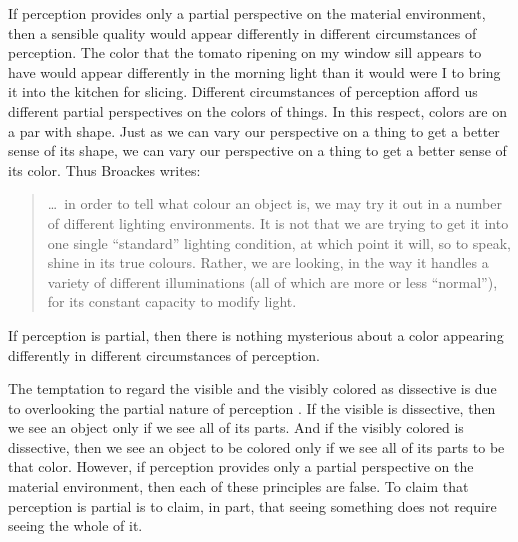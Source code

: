 \documentclass[12pt]{article}
\begin{document}
If perception provides only a partial perspective on the material environment, then a sensible quality would appear differently in different circumstances of perception. The color that the tomato ripening on my window sill appears to have would appear differently in the morning light than it would were I to bring it into the kitchen for slicing. Different circumstances of perception afford us different partial perspectives on the colors of things. In this respect, colors are on a par with shape. Just as we can vary our perspective on a thing to get a better sense of its shape, we can vary our perspective on a thing to get a better sense of its color. Thus Broackes writes:
\begin{quote}
	\ldots\ in order to tell what colour an object is, we may try it out in a number of different lighting environments. It is not that we are trying to get it into one single ``standard'' lighting condition, at which point it will, so to speak, shine in its true colours. Rather, we are looking, in the way it handles a variety of different illuminations (all of which are more or less ``normal''), for its constant capacity to modify light. \citep[215]{Broackes:1997pa} 
\end{quote}
If perception is partial, then there is nothing mysterious about a color appearing differently in different circumstances of perception. 

The temptation to regard the visible and the visibly colored as dissective is due to overlooking the partial nature of perception \citet[see][]{Hilbert:1987jq}. If the visible is dissective, then we see an object only if we see all of its parts. And if the visibly colored is dissective, then we see an object to be colored only if we see all of its parts to be that color. However, if perception provides only a partial perspective on the material environment, then each of these principles are false. To claim that perception is partial is to claim, in part, that seeing something does not require seeing the whole of it.
\end{document}
